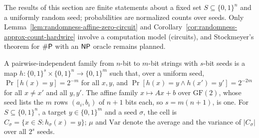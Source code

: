 The results of this section are finite statements about a fixed set
$S \subseteq \{0,1\}^n$ and a uniformly random seed; probabilities are
normalized counts over seeds. Only Lemma~\ref{lem:randomness-affine-zero-circuit}
and Corollary~\ref{cor:randomness-approx-count-hardwire} involve a
computation model (circuits), and Stockmeyer's theorem for $\#\mathsf{P}$ with an
$\mathsf{NP}$ oracle remains planned.

\begin{definition}
  \label{def:randomness-hash}
  \leanok
  A pairwise-independent family from $n$-bit to $m$-bit strings with $s$-bit
  seeds is a map $h \colon \{0,1\}^s \times \{0,1\}^n \to \{0,1\}^m$ such that,
  over a uniform seed, $\Pr[h(x) = y] = 2^{-m}$ for all $x, y$, and
  $\Pr[h(x) = y \wedge h(x') = y'] = 2^{-2m}$ for all $x \neq x'$ and all
  $y, y'$. The affine family $x \mapsto Ax + b$ over $\mathrm{GF}(2)$, whose
  seed lists the $m$ rows $(a_i, b_i)$ of $n + 1$ bits each, so
  $s = m(n+1)$, is one. For $S \subseteq \{0,1\}^n$, a target
  $y \in \{0,1\}^m$ and a seed $\sigma$, the cell is
  $C_\sigma = \{x \in S : h_\sigma(x) = y\}$; $\mu$ and $\mathrm{Var}$ denote
  the average and the variance of $|C_\sigma|$ over all $2^s$ seeds.
\end{definition}

